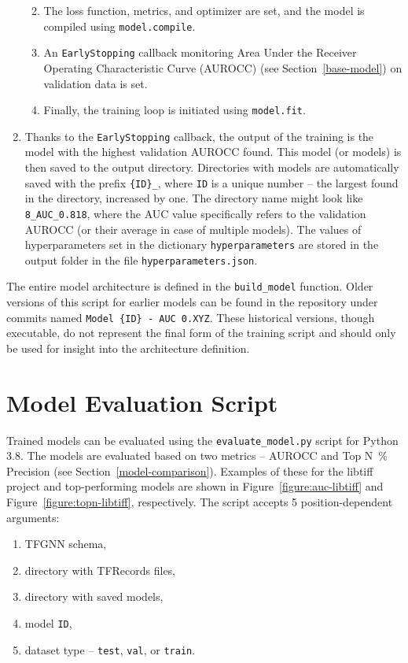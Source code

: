 \begin{enumerate}
\begin{enumerate}
\begin{enumerate}
        \end{enumerate}
        \item The loss function, metrics, and optimizer are set, and the model is compiled using \texttt{model.compile}.
        \item An \texttt{EarlyStopping} callback monitoring Area Under the Receiver Operating Characteristic Curve (AUROCC) (see Section~\ref{base-model}) on validation data is set.
        \item Finally, the training loop is initiated using \texttt{model.fit}.
    \end{enumerate}
    \item Thanks to the \texttt{EarlyStopping} callback, the output of the training is the model with the highest validation AUROCC found. This model (or models) is then saved to the output directory. Directories with models are automatically saved with the prefix \texttt{\{ID\}\_}, where \texttt{ID} is a unique number -- the largest found in the directory, increased by one. The directory name might look like \texttt{8\_AUC\_0.818}, where the AUC value specifically refers to the validation AUROCC (or their average in case of multiple models). The values of hyperparameters set in the dictionary \texttt{hyperparameters} are stored in the output folder in the file \texttt{hyperparameters.json}.

\end{enumerate}

The entire model architecture is defined in the \texttt{build\_model} function. Older versions of this script for earlier models can be found in the repository under commits named \texttt{Model \{ID\} - AUC 0.XYZ}. These historical versions, though executable, do not represent the final form of the training script and should only be used for insight into the architecture definition.

\section{Model Evaluation Script}
\label{implementation-evaluation}
Trained models can be evaluated using the \texttt{evaluate\_model.py} script for Python 3.8. The models are evaluated based on two metrics -- AUROCC and Top N~\% Precision (see Section~\ref{model-comparison}). Examples of these for the libtiff project and top-performing models are shown in Figure~\ref{figure:auc-libtiff} and Figure~\ref{figure:topn-libtiff}, respectively. The script accepts 5 position-dependent arguments:
\begin{enumerate}
    \item TFGNN schema,
    \item directory with TFRecords files,
    \item directory with saved models,
    \item model \texttt{ID},
    \item dataset type -- \texttt{test}, \texttt{val}, or \texttt{train}.
\end{enumerate}

